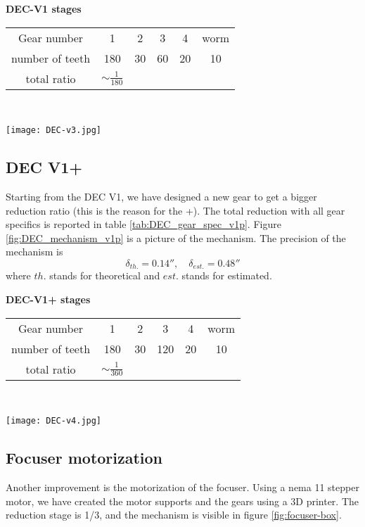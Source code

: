 \begin{minipage}
    {0.5\textwidth}
    \textbf{DEC-V1 stages}\\
    \centering
    \begin{tabular}{cccccc}
        \hline
        Gear number & 1 & 2 & 3 & 4 & worm\\
        number of teeth & 180 & 30 & 60 & 20 & 10\\
        \hline
        total ratio & \(\sim \frac{1}{180}\) &&&
    \end{tabular}
    \label{tab:DEC_gear_spec_v3}
\end{minipage}
\\
\begin{minipage}
    {0.5\textwidth}
    \centering
    \texttt{[image: DEC-v3.jpg]}
    \label{fig:DEC_mechanism_v3}
\end{minipage}

\subsection{DEC V1+}
Starting from the DEC V1, we have designed a new gear to get a bigger reduction ratio (this is the reason for the +).
The total reduction with all gear specifics is reported in table \ref{tab:DEC_gear_spec_v1p}.
Figure \ref{fig:DEC_mechanism_v1p} is a picture of the mechanism.
The precision of the mechanism is 
\[\delta_{th.}=0.14'',\quad \delta_{est.}=0.48''\]
where \(th.\) stands for theoretical and \(est.\) stands for estimated.

\begin{minipage}
    {0.5\textwidth}
    \textbf{DEC-V1+ stages}\\
    \centering
    \begin{tabular}{cccccc}
        \hline
        Gear number & 1 & 2 & 3 & 4 & worm\\
        number of teeth & 180 & 30 & 120 & 20 & 10\\
        \hline
        total ratio & \(\sim \frac{1}{360}\) &&&
    \end{tabular}
    \label{tab:DEC_gear_spec_v1p}
\end{minipage}
\\
\begin{minipage}
    {0.5\textwidth}
    \centering
    \texttt{[image: DEC-v4.jpg]}
    \label{fig:DEC_mechanism_v1p}
\end{minipage}

\subsection{Focuser motorization}
Another improvement is the motorization of the focuser.
Using a nema 11 stepper motor, we have created the motor supports and the gears using a 3D printer.
The reduction stage is 1/3, and the mechanism is visible in figure \ref{fig:focuser-box}.